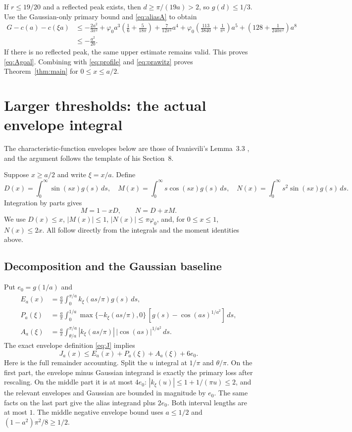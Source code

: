 \documentclass[11pt]{article}
\newcommand{\phz}{\varphi_0}
\newcommand{\ep}{e_0}
\begin{document}
If $r\le19/20$ and a reflected peak exists, then
$d\ge\pi/(19a)>2$, so $g(d)\le1/3$. Use the Gaussian-only primary bound
and \eqref{eq:aliasA} to obtain
\begin{align*}
 G-c(a)-c(\xi a)
 &\le-\frac{2a^2}{3\pi^2}
 +\phz a^3\left(\frac16+\frac5{18\pi}\right)
 +\frac7{12\pi^2}a^4
 +\phz\left(\frac{113}{3840}+\frac1{\pi^4}\right)a^5
 +\left(128+\frac1{240\pi^2}\right)a^8\\
 &\le-\frac{a^2}{20}.
\end{align*}
If there is no reflected peak, the same upper estimate remains valid.
This proves \eqref{eq:Agoal}. Combining with \eqref{eq:profile} and
\eqref{eq:prawitz} proves Theorem~\ref{thm:main} for $0\le x\le a/2$.

\section{Larger thresholds: the actual envelope integral}

The characteristic-function envelopes below are those of Ivanisvili's
Lemma~3.3 \cite{I}, and the argument follows the template of his Section~8.

Suppose $x\ge a/2$ and write $\xi=x/a$. Define
\[
 D(x)=\int_0^\infty\sin(sx)g(s)\,ds,\quad
 M(x)=\int_0^\infty s\cos(sx)g(s)\,ds,\quad
 N(x)=\int_0^\infty s^2\sin(sx)g(s)\,ds.
\]
Integration by parts gives
\[
 M=1-xD,\qquad N=D+xM.
\]
We use $D(x)\le x$, $|M(x)|\le1$, $|N(x)|\le\pi\phz$, and, for
$0\le x\le1$, $N(x)\le2x$. All follow directly from the integrals and
the moment identities above.

\subsection{Decomposition and the Gaussian baseline}

Put $\ep=g(1/a)$ and
\begin{align*}
 E_a(x)&=\frac a\pi\int_0^{\pi/a} k_\xi(as/\pi)g(s)\,ds,\\
 P_a(\xi)&=\frac a\pi\int_0^{1/a}
  \max\{-k_\xi(as/\pi),0\}\,[g(s)-\cos(as)^{1/a^2}]\,ds,\\
 A_a(\xi)&=\frac a\pi\int_{\theta/a}^{\pi/a}
  |k_\xi(as/\pi)|\,|\cos(as)|^{1/a^2}\,ds.
\end{align*}
The exact envelope definition \eqref{eq:J} implies
\begin{equation}\label{eq:decomp}
 J_a(x)\le E_a(x)+P_a(\xi)+A_a(\xi)+6\ep.
\end{equation}
Here is the full remainder accounting. Split the $u$ integral at $1/\pi$
and $\theta/\pi$. On the first part, the envelope minus Gaussian integrand
is exactly the primary loss after rescaling. On the middle part it is at
most $4\ep$: $|k_\xi(u)|\le1+1/(\pi u)\le2$, and the relevant envelopes
and Gaussian are bounded in magnitude by $\ep$. The same facts on the last
part give the alias integrand plus $2\ep$. Both interval lengths are at
most $1$. The middle negative envelope bound uses $a\le1/2$ and
$(1-a^2)\pi^2/8\ge1/2$.
\end{document}
